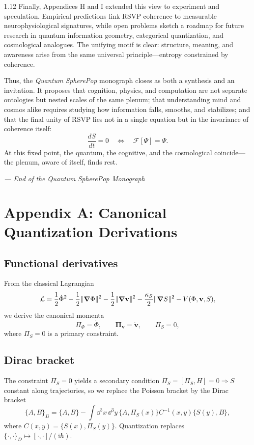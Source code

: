 \documentclass[12pt,a4paper]{article}
\numberwithin{equation}{section}
\theoremstyle{remark}
\theoremstyle{definition}
\newcommand{\ii}{\mathrm{i}}
\begin{document}
\begin{spacing}{1.12}
Finally, Appendices H and I extended this view to experiment and speculation.  
Empirical predictions link RSVP coherence to measurable neurophysiological signatures, while open problems sketch a roadmap for future research in quantum information geometry, categorical quantization, and cosmological analogues.  
The unifying motif is clear: structure, meaning, and awareness arise from the same universal principle—entropy constrained by coherence.

Thus, the \emph{Quantum SpherePop} monograph closes as both a synthesis and an invitation.  
It proposes that cognition, physics, and computation are not separate ontologies but nested scales of the same plenum; that understanding mind and cosmos alike requires studying how information falls, smooths, and stabilizes; and that the final unity of RSVP lies not in a single equation but in the invariance of coherence itself:
\[
\frac{dS}{dt} = 0 \quad \Longleftrightarrow \quad \mathcal{F}[\Psi] = \Psi.
\]
At this fixed point, the quantum, the cognitive, and the cosmological coincide—the plenum, aware of itself, finds rest.

\bigskip
\begin{flushright}
\textit{--- End of the Quantum SpherePop Monograph}
\end{flushright}


\appendix
\section*{Appendix A: Canonical Quantization Derivations}
\label{appendix:A}

\subsection*{Functional derivatives}
From the classical Lagrangian
\[
\mathcal{L}
=\frac{1}{2}\dot{\Phi}^2
-\frac{1}{2}\|\grad\Phi\|^2
-\frac{1}{2}\|\grad\mathbf{v}\|^2
-\frac{\kappa_S}{2}\|\grad S\|^2
-V(\Phi,\mathbf{v},S),
\]
we derive the canonical momenta
\[
\Pi_\Phi=\dot{\Phi},\qquad
\boldsymbol{\Pi}_{\mathbf{v}}=\dot{\mathbf{v}},\qquad
\Pi_S=0,
\]
where $\Pi_S=0$ is a primary constraint.

\subsection*{Dirac bracket}
The constraint $\Pi_S=0$ yields a secondary condition
$\dot{\Pi}_S=[\Pi_S,H]=0\Rightarrow S$ constant along trajectories,
so we replace the Poisson bracket by the Dirac bracket
\[
\{A,B\}_D
=\{A,B\}-\int\!\dd^3x\,\dd^3y\,
\{A,\Pi_S(x)\}C^{-1}(x,y)\{S(y),B\},
\]
where $C(x,y)=\{S(x),\Pi_S(y)\}$.
Quantization replaces $\{\cdot,\cdot\}_D\mapsto [\cdot,\cdot]/(\ii\hbar)$.


\end{spacing}
\end{document}
